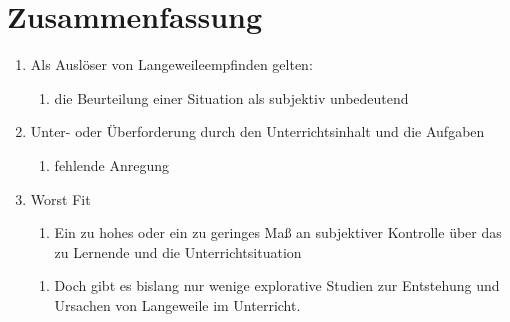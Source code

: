 
\chapter{Zusammenfassung}
\label{chapter-fazit}


\begin{enumerate}
\item Als Auslöser von Langeweileempfinden gelten:
\begin{enumerate}
\item die Beurteilung einer Situation als subjektiv unbedeutend
\end{enumerate}
\item Unter- oder Überforderung durch den Unterrichtsinhalt und die Aufgaben
\begin{enumerate}
\item fehlende Anregung
\end{enumerate}
\item Worst Fit 
\begin{enumerate}
\item Ein zu hohes oder ein zu geringes Maß an subjektiver Kontrolle über das zu Lernende und die Unterrichtsituation
\end{enumerate}
\begin{enumerate}
\item  Doch gibt es bislang nur wenige explorative Studien zur Entstehung und Ursachen von Langeweile im Unterricht.
\end{enumerate}
\end{enumerate}

